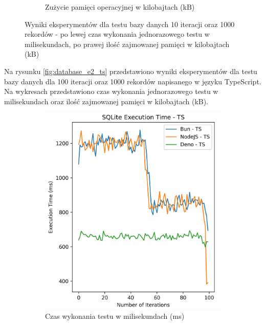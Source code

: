\begin{figure}[H]
\begin{subfigure}[b]{0.42\textwidth}
    \caption{Zużycie pamięci operacyjnej w kilobajtach (kB)}
    \label{fig:database_e2_js_memory}
  \end{subfigure}
  \caption{Wyniki eksperymentów dla testu bazy danych 10 iteracji oraz 1000 rekordów - po lewej czas wykonania jednorazowego testu w milisekundach, po prawej ilość zajmowanej pamięci w kilobajtach (kB)}
  \label{fig:database_e2_js}
\end{figure}

Na rysunku \ref{fig:database_e2_ts} przedstawiono wyniki eksperymentów dla testu bazy danych dla 100 iteracji oraz 1000 rekordów napisanego w języku TypeScript. Na wykresach przedstawiono czas wykonania jednorazowego testu w milisekundach oraz ilość zajmowanej pamięci w kilobajtach (kB).

\begin{figure}[H]
  \centering
  \begin{subfigure}[b]{0.42\textwidth}
    \centering
    \includegraphics[width=\textwidth]{Figures/database/sqlite_100_1000_ts_time.png}
    \caption{Czas wykonania testu w milisekundach (ms)}
    \label{fig:database_e2_ts_time}
  \end{subfigure}
  \begin{subfigure}[b]{0.42\textwidth}

\end{subfigure}
\end{figure}
